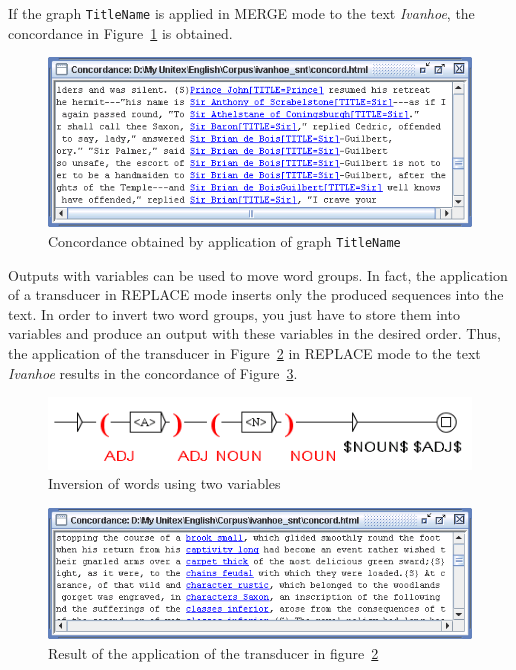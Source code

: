 \bigskip
\noindent If the graph \verb+TitleName+ is applied in MERGE mode to the text
\textit{Ivanhoe}, the concordance in Figure~\ref{fig6-14} is obtained.

\begin{figure}[!p]
\begin{center}
\includegraphics[width=13.5cm]{resources/img/fig6-26.png}
\caption{Concordance obtained by application of graph \texttt{TitleName}\label{fig6-14}}
\end{center}
\end{figure}

\bigskip
\noindent Outputs with variables can be used to move word groups. In
fact, the application of a transducer in REPLACE mode inserts only the produced sequences
into the text. In order to invert two word groups, you just have to
store them into variables and produce an output with these variables in the
desired order. Thus, the application of the transducer in
Figure~\ref{fig-swapping-words} in REPLACE mode to the text \textit{Ivanhoe}
results in the concordance of
Figure~\ref{fig-no-space-problem}.

\begin{figure}[!ht]
\begin{center}
\includegraphics[width=11.3cm]{resources/img/fig6-27.png}
\caption{Inversion of words using two variables\label{fig-swapping-words}}
\end{center}
\end{figure}

\begin{figure}[!ht]
\begin{center}
\includegraphics[width=13.4cm]{resources/img/fig6-28.png}
\caption{Result of the application of the transducer in 
figure~\ref{fig-swapping-words}\label{fig-no-space-problem}}
\end{center}
\end{figure}

